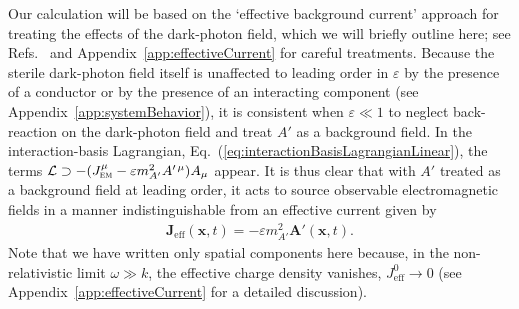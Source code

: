 \documentclass[amsmath,amssymb,aps,10pt,prd,letterpaper,nofootinbib,balancelastpage,notitlepage,superscriptaddress,twocolumn,floatfix]{revtex4-2}
\newcommand{\appref}[2][x]{Appendi{#1}~\ref{#2}}	%
\renewcommand{\eqref}[2][]{Eq{#1}.~(\ref{eq:#2})}	%
\newcommand{\citeR}[2][]{Ref{#1}.~\cite{#2}}		%
\newcommand{\tsc}[1]{\textsc{#1}}
\newcommand{\LL}{\mathcal{L}}
\begin{document}
Our calculation will be based on the `effective background current' approach for treating the effects of the dark-photon field, which we will briefly outline here; see \citeR[s]{Graham:2014sha,Chaudhuri:2014dla} and \appref{app:effectiveCurrent} for careful treatments.
Because the sterile dark-photon field itself is unaffected to leading order in $\varepsilon$ by the presence of a conductor or by the presence of an interacting component (see \appref{app:systemBehavior}), it is consistent when $\varepsilon\ll1$ to neglect back-reaction on the dark-photon field and treat $A'$ as a background field. 
In the interaction-basis Lagrangian, \eqref{interactionBasisLagrangianLinear}, the terms $\LL \supset -(J^\mu_{\tsc{em}}-\varepsilon m_{A'}^2A^{\prime\, \mu}  )A_\mu $ appear.
It is thus clear that with $A'$ treated as a background field at leading order, it acts to source observable electromagnetic fields in a manner indistinguishable from an effective current given by
\begin{align}
    \bm{J}_\text{eff}(\bm{x},t)=-\varepsilon m_{A'}^2\bm{A}'(\bm{x},t).
    \label{eq:JeffAprime}
\end{align}
Note that we have written only spatial components here because, in the non-relativistic limit $\omega \gg k$, the effective charge density vanishes,  $J_{\text{eff}}^0 \rightarrow 0$ (see \appref{app:effectiveCurrent} for a detailed discussion).
\end{document}
